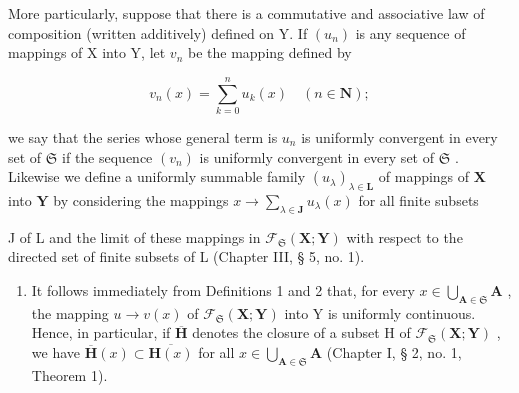 More particularly, suppose that there is a commutative and associative law of composition (written additively) defined on Y. If \((u_{n})\) is any sequence of mappings of X into Y, let \(v_{n}\) be the mapping defined by

\[
v _ {n} (x) = \sum_ {k = 0} ^ {n} u _ {k} (x) \quad (n \in \mathbf {N});
\]

we say that the series whose general term is \(u_n\) is uniformly convergent in every set of \(\mathfrak{S}\) if the sequence \((v_n)\) is uniformly convergent in every set of \(\mathfrak{S}\) . Likewise we define a uniformly summable family \((u_\lambda)_{\lambda \in \mathbf{L}}\) of mappings of \(\mathbf{X}\) into \(\mathbf{Y}\) by considering the mappings \(x \to \sum_{\lambda \in \mathbf{J}} u_\lambda(x)\) for all finite subsets

J of L and the limit of these mappings in \(\mathcal{F}_{\mathfrak{S}}(\mathbf{X};\mathbf{Y})\) with respect to the directed set of finite subsets of L (Chapter III, § 5, no. 1).

\begin{enumerate}
\def\labelenumi{\arabic{enumi})}
\setcounter{enumi}{5}
\tightlist
\item
  It follows immediately from Definitions 1 and 2 that, for every \(x \in \bigcup_{\mathbf{A} \in \mathfrak{S}} \mathbf{A}\) , the mapping \(u \to v(x)\) of \(\mathcal{F}_{\mathfrak{S}}(\mathbf{X}; \mathbf{Y})\) into Y is uniformly continuous. Hence, in particular, if \(\overline{\mathbf{H}}\) denotes the closure of a subset H of \(\mathcal{F}_{\mathfrak{S}}(\mathbf{X}; \mathbf{Y})\) , we have \(\overline{\mathbf{H}}(x) \subset \overline{\mathbf{H}(x)}\) for all \(x \in \bigcup_{\mathbf{A} \in \mathfrak{S}} \mathbf{A}\) (Chapter I, § 2, no. 1, Theorem 1).
\end{enumerate}

